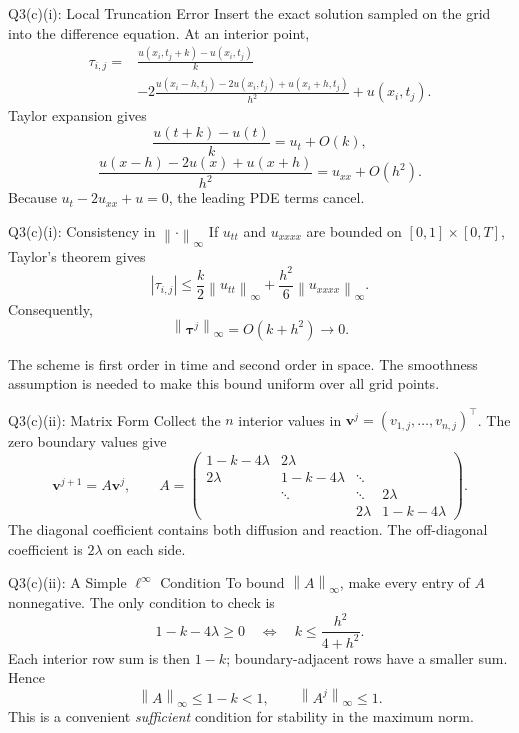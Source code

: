 \documentclass{beamer}
\newcommand{\norm}[1]{\left\|#1\right\|}
\begin{document}
\begin{frame}{Q3(c)(i): Local Truncation Error}
Insert the exact solution sampled on the grid into the difference
equation. At an interior point,
\[
\begin{aligned}
\tau_{i,j}
={}&\frac{u(x_i,t_j+k)-u(x_i,t_j)}{k}\\
&-2\frac{u(x_i-h,t_j)-2u(x_i,t_j)+u(x_i+h,t_j)}{h^2}
 +u(x_i,t_j).
\end{aligned}
\]
Taylor expansion gives
\[
\frac{u(t+k)-u(t)}{k}=u_t+O(k),
\]
\[
\frac{u(x-h)-2u(x)+u(x+h)}{h^2}
=u_{xx}+O(h^2).
\]
Because $u_t-2u_{xx}+u=0$, the leading PDE terms cancel.
\end{frame}

\begin{frame}{Q3(c)(i): Consistency in $\norm{\cdot}_\infty$}
If $u_{tt}$ and $u_{xxxx}$ are bounded on
$[0,1]\times[0,T]$, Taylor's theorem gives
\[
|\tau_{i,j}|
\leq \frac{k}{2}\norm{u_{tt}}_\infty
 +\frac{h^2}{6}\norm{u_{xxxx}}_\infty.
\]
Consequently,
\[
\boxed{\norm{\bm\tau^j}_\infty=O(k+h^2)\longrightarrow0.}
\]

The scheme is first order in time and second order in space.
The smoothness assumption is needed to make this bound uniform
over all grid points.
\end{frame}

\begin{frame}{Q3(c)(ii): Matrix Form}
Collect the $n$ interior values in
$\bm v^j=(v_{1,j},\ldots,v_{n,j})^\top$. The zero boundary
values give
\[
\bm v^{j+1}=A\bm v^j,
\qquad
A=\begin{pmatrix}
1-k-4\lambda & 2\lambda & & \\
2\lambda & 1-k-4\lambda & \ddots & \\
 & \ddots & \ddots & 2\lambda\\
 & & 2\lambda & 1-k-4\lambda
\end{pmatrix}.
\]
The diagonal coefficient contains both diffusion and reaction.
The off-diagonal coefficient is $2\lambda$ on each side.
\end{frame}

\begin{frame}{Q3(c)(ii): A Simple $\ell^\infty$ Condition}
To bound $\norm{A}_\infty$, make every entry of $A$
nonnegative. The only condition to check is
\[
1-k-4\lambda\geq0
\quad\Longleftrightarrow\quad
\boxed{k\leq\frac{h^2}{4+h^2}}.
\]
Each interior row sum is then $1-k$; boundary-adjacent rows
have a smaller sum. Hence
\[
\norm{A}_\infty\leq1-k<1,
\qquad
\norm{A^j}_\infty\leq1.
\]
This is a convenient \emph{sufficient} condition for stability
in the maximum norm.
\end{frame}
\end{document}
